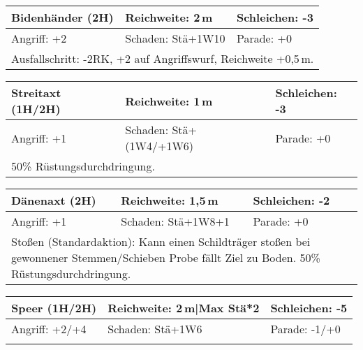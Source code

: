\documentclass[../../Heldenanleitung2]{subfiles}
\begin{document}
\newline \newline\newline
\begin{tabular}{|p{}|p{}|p{}|}
\hline
\textbf{Bidenhänder (2H)} & Reichweite: 2\,m & Schleichen: -3\\
\hline
Angriff: +2 & Schaden: Stä+1W10 & Parade: +0\\
\hline
\multicolumn{3}{|p{0.99\textwidth}|}{Ausfallschritt: -2RK, +2 auf Angriffswurf, Reichweite +0,5\,m.} \\
\hline
\end{tabular}
\newline \newline\newline
\begin{tabular}{|p{}|p{}|p{}|}
\hline
\textbf{Streitaxt (1H/2H)} & Reichweite: 1\,m & Schleichen: -3\\
\hline
Angriff: +1 & Schaden: Stä+(1W4/+1W6) & Parade: +0\\
\hline
\multicolumn{3}{|p{0.99\textwidth}|}{50\% Rüstungsdurchdringung.} \\
\hline
\end{tabular}
\newline \newline\newline
\begin{tabular}{|p{}|p{}|p{}|}
\hline
\textbf{Dänenaxt (2H)} & Reichweite: 1,5\,m & Schleichen: -2\\
\hline
Angriff: +1 & Schaden: Stä+1W8+1 & Parade: +0\\
\hline
\multicolumn{3}{|p{0.99\textwidth}|}{Stoßen (Standardaktion): Kann einen Schildträger stoßen bei gewonnener Stemmen/Schieben Probe fällt Ziel zu Boden. 50\% Rüstungsdurchdringung.} \\
\hline
\end{tabular}
\newline \newline\newline
\begin{tabular}{|p{}|p{}|p{}|}
\hline
\textbf{Speer (1H/2H)} & Reichweite: 2\,m|Max Stä*2 & Schleichen: -5\\
\hline
Angriff: +2/+4 & Schaden: Stä+1W6 & Parade: -1/+0\\
\hline
\multicolumn{3}{|p{0.99\textwidth}|}{} \\
\hline
\end{tabular}
\end{document}
